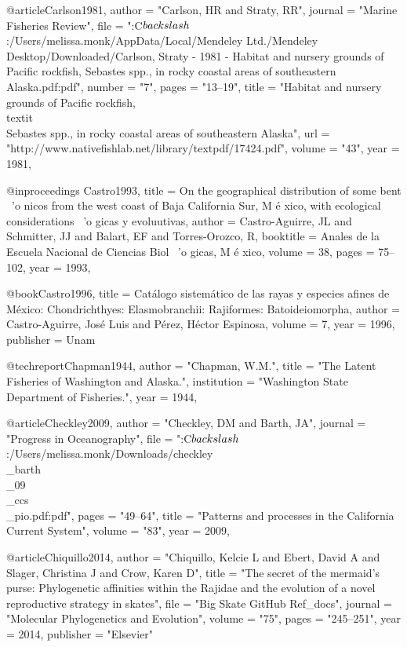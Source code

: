 @article{Carlson1981,
    author = "{Carlson, HR and Straty, RR}",
    journal = "{Marine Fisheries Review}",
    file = "{:C$\\backslash$:/Users/melissa.monk/AppData/Local/Mendeley Ltd./Mendeley Desktop/Downloaded/Carlson, Straty - 1981 - Habitat and nursery grounds of Pacific rockfish, Sebastes spp., in rocky coastal areas of southeastern Alaska.pdf:pdf}",
    number = "{7}",
    pages = "{13--19}",
    title = "{{Habitat and nursery grounds of Pacific rockfish, \\textit\\{{Sebastes}} spp., in rocky coastal areas of southeastern Alaska}}",
    url = "{http://www.nativefishlab.net/library/textpdf/17424.pdf}",
    volume = "{43}",
    year = 1981,
}

@inproceedings {Castro1993,
  title = {On the geographical distribution of some bent {\ 'o} nicos from the west coast of Baja California Sur, M {\' e} xico, with ecological considerations { \ 'o} gicas y evoluutivas},
  author = {Castro-Aguirre, JL and Schmitter, JJ and Balart, EF and Torres-Orozco, R},
  booktitle = {Anales de la Escuela Nacional de Ciencias Biol {\ 'o} gicas, M {\' e} xico},
  volume = {38},
  pages = {75--102},
  year = 1993,
}

@book{Castro1996,
  title = {Cat{\'a}logo sistem{\'a}tico de las rayas y especies afines de M{\'e}xico: Chondrichthyes: Elasmobranchii: Rajiformes: Batoideiomorpha},
  author = {Castro-Aguirre, Jos{\'e} Luis and P{\'e}rez, H{\'e}ctor Espinosa},
  volume = {7},
  year = 1996,
  publisher = {Unam}
}

@techreport{Chapman1944,
    author = "{Chapman, W.M.}",
    title = "{The Latent Fisheries of Washington and Alaska.}",
    institution = "{Washington State Department of Fisheries.}",
    year = 1944,
}

@article{Checkley2009,
    author = "{Checkley, DM and Barth, JA}",
    journal = "{Progress in Oceanography}",
    file = "{:C$\\backslash$:/Users/melissa.monk/Downloads/checkley\\_barth\\_09\\_ccs\\_pio.pdf:pdf}",
    pages = "{49--64}",
    title = "{{Patterns and processes in the California Current System}}",
    volume = "{83}",
    year = 2009,
}

@article{Chiquillo2014,
  author = "{Chiquillo, Kelcie L and Ebert, David A and Slager, Christina J and Crow, Karen D}",
  title = "{The secret of the mermaid’s purse: Phylogenetic affinities within the Rajidae and the evolution of a novel reproductive strategy in skates}",
  file = "{Big Skate GitHub Ref_docs}",
  journal = "{Molecular Phylogenetics and Evolution}",
  volume = "{75}",
  pages = "{245--251}",
  year = 2014,
  publisher = "{Elsevier}"
}

